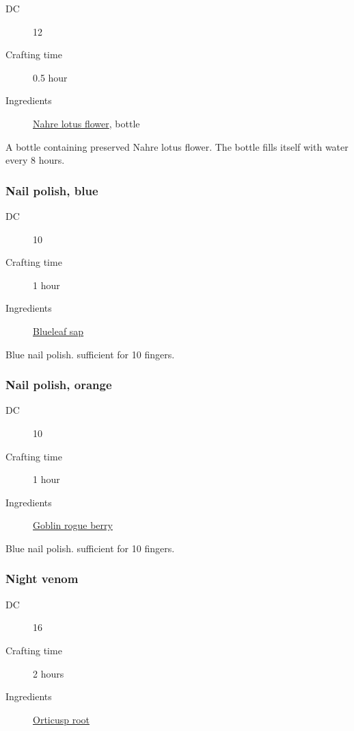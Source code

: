 \begin{description}
\item [DC] 12 \arcana
\item [Crafting time] 0.5 hour
\item [Ingredients] \hyperref[Nahre Lotus]{Nahre lotus flower}, bottle
\end{description}

A bottle containing preserved Nahre lotus flower. The bottle fills itself with water every 8 hours.

\subsubsection{Nail polish, blue}
\label{nail_polish_blue}

\begin{description}
\item [DC] 10 \nature
\item [Crafting time] 1 hour
\item [Ingredients] \hyperref[Blueleaf]{Blueleaf sap}
\end{description}

Blue nail polish. sufficient for 10 fingers.

\subsubsection{Nail polish, orange}
\label{nail_polish_orange}

\begin{description}
\item [DC] 10 \nature
\item [Crafting time] 1 hour
\item [Ingredients]  \hyperref[Goblin Rogue]{Goblin rogue berry}
\end{description}

Blue nail polish. sufficient for 10 fingers.

\subsubsection{Night venom}
\label{Night venom}

\begin{description}
\item [DC] 16 \nature
\item [Crafting time] 2 hours
\item [Ingredients] \hyperref[Orticusp]{Orticusp root}
\end{description}


